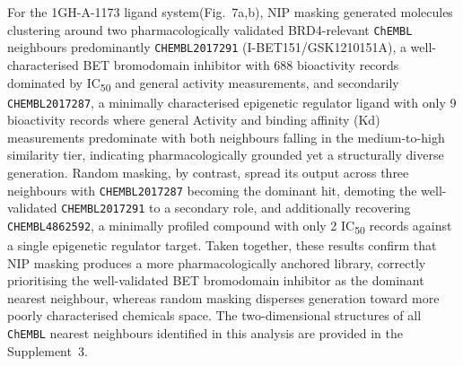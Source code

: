 \documentclass[a4paper,12pt]{article}
\begin{document}
For the 1GH-A-1173 ligand system(Fig.~7a,b), NIP masking generated molecules 
clustering around two pharmacologically validated BRD4-relevant 
\texttt{ChEMBL} neighbours  predominantly \texttt{CHEMBL2017291} 
(I-BET151/GSK1210151A), a well-characterised BET bromodomain inhibitor 
with 688 bioactivity records dominated by IC\textsubscript{50} and 
general activity measurements, and secondarily \texttt{CHEMBL2017287}, 
a minimally characterised epigenetic regulator ligand with only 9 
bioactivity records where general Activity and binding affinity (Kd) 
measurements predominate with both neighbours falling in the 
medium-to-high similarity tier, indicating pharmacologically grounded 
yet a structurally diverse generation. Random masking, by contrast, spread 
its output across three neighbours with \texttt{CHEMBL2017287} becoming 
the dominant hit, demoting the well-validated \texttt{CHEMBL2017291} to 
a secondary role, and additionally recovering \texttt{CHEMBL4862592}, a 
minimally profiled compound with only 2 IC\textsubscript{50} records 
against a single epigenetic regulator target. Taken together, these results confirm that NIP masking produces a more pharmacologically 
anchored library, correctly prioritising the well-validated BET 
bromodomain inhibitor as the dominant nearest neighbour, whereas random 
masking disperses generation toward more poorly characterised chemicals 
space. The two-dimensional structures of all \texttt{ChEMBL} nearest neighbours identified in this analysis are provided in the Supplement~3.
\end{document}
